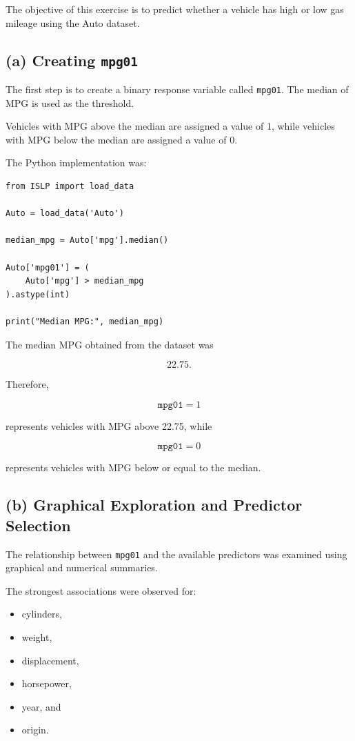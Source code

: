 \documentclass[12pt,a4paper]{article}
\begin{document}
The objective of this exercise is to predict whether a vehicle has high or
low gas mileage using the Auto dataset.

\subsection{(a) Creating \texttt{mpg01}}

The first step is to create a binary response variable called
\texttt{mpg01}. The median of MPG is used as the threshold.

Vehicles with MPG above the median are assigned a value of 1, while vehicles
with MPG below the median are assigned a value of 0.

The Python implementation was:

\begin{lstlisting}
from ISLP import load_data

Auto = load_data('Auto')

median_mpg = Auto['mpg'].median()

Auto['mpg01'] = (
    Auto['mpg'] > median_mpg
).astype(int)

print("Median MPG:", median_mpg)
\end{lstlisting}

The median MPG obtained from the dataset was

\[
\boxed{22.75}.
\]

Therefore,

\[
\texttt{mpg01}=1
\]

represents vehicles with MPG above 22.75, while

\[
\texttt{mpg01}=0
\]

represents vehicles with MPG below or equal to the median.

\subsection{(b) Graphical Exploration and Predictor Selection}

The relationship between \texttt{mpg01} and the available predictors was
examined using graphical and numerical summaries.

The strongest associations were observed for:

\begin{itemize}
    \item cylinders,
    \item weight,
    \item displacement,
    \item horsepower,
    \item year, and
    \item origin.
\end{itemize}
\end{document}
